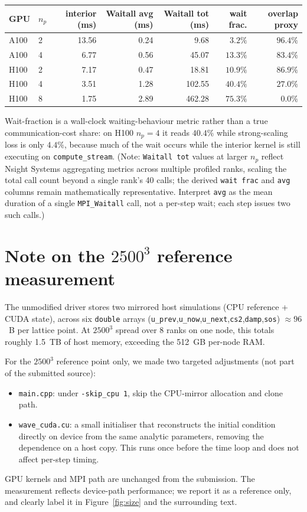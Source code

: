 \documentclass[10pt,a4paper]{article}
\begin{document}
\begin{center}\small
\begin{tabular}{@{}llrrrrr@{}}
\toprule
GPU & $n_p$ & interior (ms) & Waitall avg (ms) & Waitall tot (ms) & wait frac. & overlap proxy \\
\midrule
A100 & 2 & 13.56 & 0.24 & 9.68    & $3.2\%$  & $96.4\%$ \\
A100 & 4 & 6.77  & 0.56 & 45.07   & $13.3\%$ & $83.4\%$ \\
H100 & 2 & 7.17  & 0.47 & 18.81   & $10.9\%$ & $86.9\%$ \\
H100 & 4 & 3.51  & 1.28 & 102.55  & $40.4\%$ & $27.0\%$ \\
H100 & 8 & 1.75  & 2.89 & 462.28  & $75.3\%$ & $0.0\%$  \\
\bottomrule
\end{tabular}
\end{center}
Wait-fraction is a wall-clock waiting-behaviour metric rather than a true communication-cost share: on H100 $n_p{=}4$ it reads $40.4\%$ while strong-scaling loss is only $4.4\%$, because much of the wait occurs while the interior kernel is still executing on \texttt{compute\_stream}. (Note: \texttt{Waitall tot} values at larger $n_p$ reflect Nsight Systems aggregating metrics across multiple profiled ranks, scaling the total call count beyond a single rank's 40 calls; the derived \texttt{wait frac} and \texttt{avg} columns remain mathematically representative. Interpret \texttt{avg} as the mean duration of a single \texttt{MPI\_Waitall} call, not a per-step wait; each step issues two such calls.)

\section{Note on the $2500^3$ reference measurement}
\label{app:2500}
The unmodified driver stores two mirrored host simulations (CPU reference + CUDA state), across six \texttt{double} arrays (\texttt{u\_prev},\texttt{u\_now},\texttt{u\_next},\texttt{cs2},\texttt{damp},\texttt{sos}) $\approx 96$~B per lattice point. At $2500^3$ spread over 8 ranks on one node, this totals roughly 1.5~TB of host memory, exceeding the 512~GB per-node RAM.

For the $2500^3$ reference point only, we made two targeted adjustments (not part of the submitted source):
\begin{itemize}
\item \texttt{main.cpp}: under \texttt{-skip\_cpu 1}, skip the CPU-mirror allocation and clone path.
\item \texttt{wave\_cuda.cu}: a small initialiser that reconstructs the initial condition directly on device from the same analytic parameters, removing the dependence on a host copy. This runs once before the time loop and does not affect per-step timing.
\end{itemize}
GPU kernels and MPI path are unchanged from the submission. The measurement reflects device-path performance; we report it as a reference only, and clearly label it in Figure~\ref{fig:size} and the surrounding text.
\end{document}
